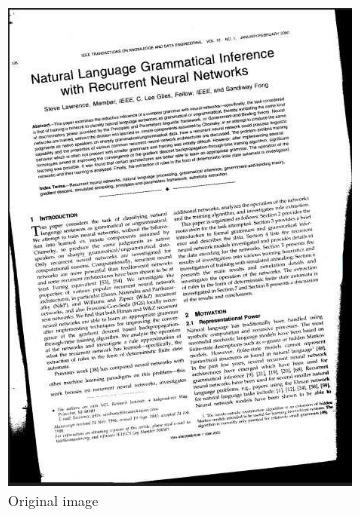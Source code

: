 \begin{figure}[H]
\centering
\hspace*{\fill} %
\begin{subfigure}{0.31\textwidth}
\includegraphics[width=\linewidth]{img/deskew_orig.jpg}
\caption{Original image} \label{fig:1a}
\end{subfigure}
\hspace*{\fill} %
\begin{subfigure}{0.31\textwidth}

\end{subfigure}
\end{figure}

